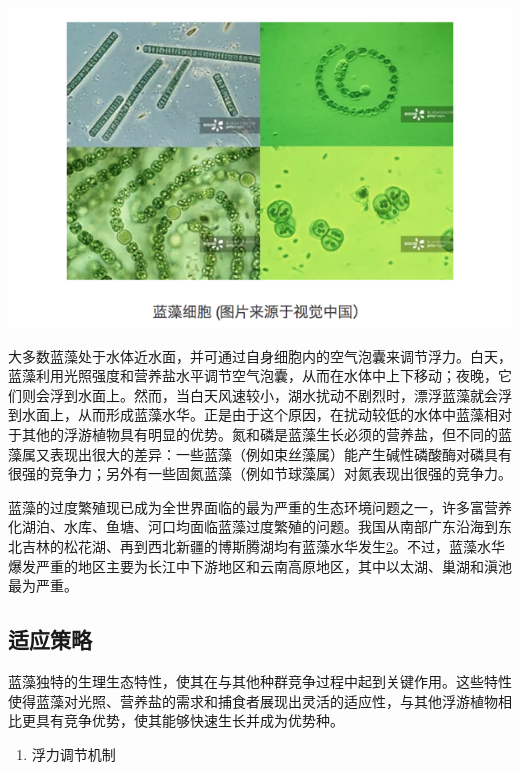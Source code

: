 \documentclass[]{book}
\providecommand{\tightlist}{%
  \setlength{\itemsep}{0pt}\setlength{\parskip}{0pt}}
\begin{document}
\includegraphics[width=8.33in]{images/lanzao1}

大多数蓝藻处于水体近水面，并可通过自身细胞内的空气泡囊来调节浮力。白天，蓝藻利用光照强度和营养盐水平调节空气泡囊，从而在水体中上下移动；夜晚，它们则会浮到水面上。然而，当白天风速较小，湖水扰动不剧烈时，漂浮蓝藻就会浮到水面上，从而形成蓝藻水华。正是由于这个原因，在扰动较低的水体中蓝藻相对于其他的浮游植物具有明显的优势。氮和磷是蓝藻生长必须的营养盐，但不同的蓝藻属又表现出很大的差异：一些蓝藻（例如束丝藻属）能产生碱性磷酸酶对磷具有很强的竞争力；另外有一些固氮蓝藻（例如节球藻属）对氮表现出很强的竞争力。

蓝藻的过度繁殖现已成为全世界面临的最为严重的生态环境问题之一，许多富营养化湖泊、水库、鱼塘、河口均面临蓝藻过度繁殖的问题。我国从南部广东沿海到东北吉林的松花湖、再到西北新疆的博斯腾湖均有蓝藻水华发生\href{Kezhen\%20Qian,\%20Ajay\%20Kumar,\%20et.al.\%20Renew.\%20and\%20Sustain.\%20Energy\%20Reviews,\%202015,\%2042:\%201055-1064.}{2}。不过，蓝藻水华爆发严重的地区主要为长江中下游地区和云南高原地区，其中以太湖、巢湖和滇池最为严重。

\subsection{适应策略}

蓝藻独特的生理生态特性，使其在与其他种群竞争过程中起到关键作用。这些特性使得蓝藻对光照、营养盐的需求和捕食者展现出灵活的适应性，与其他浮游植物相比更具有竞争优势，使其能够快速生长并成为优势种。

\begin{enumerate}
\def\labelenumi{\arabic{enumi}.}
\tightlist
\item
  浮力调节机制
\end{enumerate}
\end{document}
